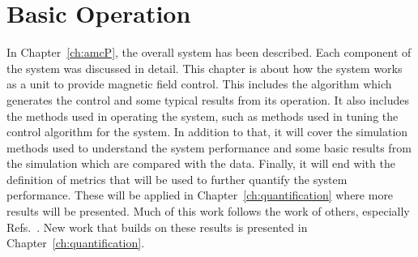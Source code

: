 
\chapter{Basic Operation}\label{ch:operation}







In Chapter~\ref{ch:amcP}, the overall system has been described.  Each component of the system was discussed in detail. This chapter is about how the system works as a unit to provide magnetic field control.  This includes the algorithm which generates the control and some typical results from its operation.  It also includes the methods used in operating the system, such as methods used in tuning the control algorithm for the system. In addition to that, it will cover the simulation methods used to understand the system performance and some basic results from the simulation which are compared with the data. Finally, it will end with the definition of metrics that will be used to further quantify the system performance.  These will be applied in Chapter~\ref{ch:quantification} where more results will be presented. Much of this work follows the work of others, especially Refs.~\cite{bea,rawlik,lins}.  New work that builds on these results is presented in Chapter~\ref{ch:quantification}.

